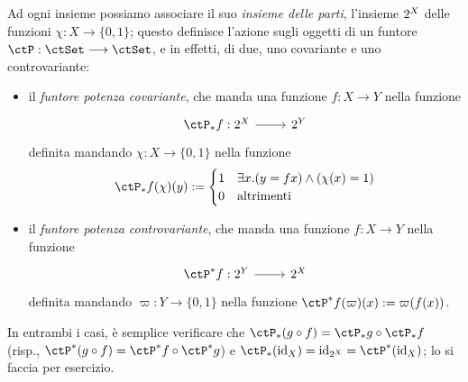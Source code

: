 \begin{example}\label{ex_fun_parti}
	Ad ogni insieme possiamo associare il suo \emph{insieme delle parti}, l'insieme \(2^{X}\) delle funzioni \(\chi : X \to \{0,1\}\); questo definisce l'azione sugli oggetti di un funtore \(\ctP : \ctSet\fun\ctSet\),	e in effetti, di due, uno covariante e uno controvariante:
	\begin{itemize}
		\item il \emph{funtore potenza covariante}, che manda una funzione \(f : X\to Y\) nella funzione
		      \[\dmFun{\ctP_* f}{\pow X}{\pow Y}\]
		      definita mandando \(\chi : X\to \{0,1\}\) nella funzione \[\ctP_* f(\chi)(y) := \begin{cases}
				      1 & \exists x . (y = fx) \land (\chi(x) = 1) \\
				      0 & \text{altrimenti}                        \\
			      \end{cases}\]
		\item il \emph{funtore potenza controvariante}, che manda una funzione \(f : X\to Y\) nella funzione
		      \[\dmFun{\ctP^* f}{\pow Y}{\pow X}\]
		      definita mandando \(\varpi : Y \to \{0,1\}\) nella funzione \(\ctP^* f(\varpi)(x) := \varpi(f(x))\).
	\end{itemize}
	In entrambi i casi, è semplice verificare che \(\ctP_* (g\cmp f) = \ctP_* g\cmp \ctP_* f\) (risp., \(\ctP^* (g\cmp f) = \ctP^* f\cmp \ctP^* g\)) e \(\ctP_*(\Id[X]) = \Id[\pow X] = \ctP^*(\Id[X])\); lo si faccia per esercizio.
\end{example}
